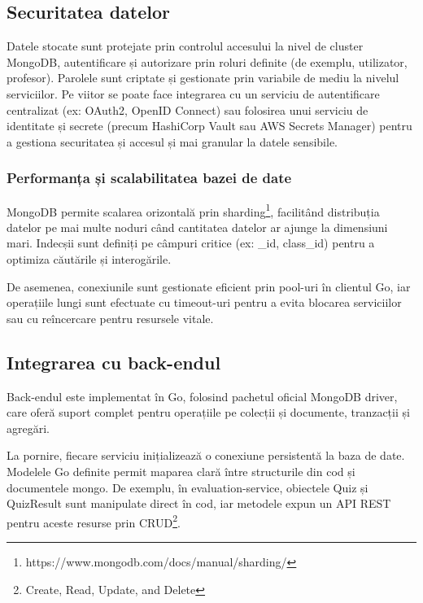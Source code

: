 \subsection{Securitatea datelor}

Datele stocate sunt protejate prin controlul accesului la nivel de cluster MongoDB, autentificare
și autorizare prin roluri definite (de exemplu, utilizator, profesor).
Parolele sunt criptate și gestionate prin variabile de mediu la nivelul serviciilor. Pe viitor 
se poate face integrarea cu un serviciu de autentificare centralizat (ex: OAuth2, OpenID Connect)
sau folosirea unui serviciu de identitate și secrete (precum HashiCorp Vault sau AWS Secrets Manager) pentru a gestiona
securitatea și accesul și mai granular la datele sensibile.

\subsubsection{Performanța și scalabilitatea bazei de date}

MongoDB permite scalarea orizontală prin sharding\footnote{https://www.mongodb.com/docs/manual/sharding/}, facilitând distribuția datelor pe mai multe noduri când 
cantitatea datelor ar ajunge la dimensiuni mari. Indecșii sunt definiți pe câmpuri critice 
(ex: \_id, class\_id) pentru a optimiza căutările și interogările.

De asemenea, conexiunile sunt gestionate eficient prin pool-uri în clientul Go, iar operațiile
lungi sunt efectuate cu timeout-uri pentru a evita blocarea serviciilor sau cu reîncercare pentru
resursele vitale.

\subsection{Integrarea cu back-endul}

Back-endul este implementat în Go, folosind pachetul oficial MongoDB driver, care oferă suport
complet pentru operațiile pe colecții și documente, tranzacții și agregări. 

La pornire, fiecare serviciu inițializează o conexiune persistentă la baza de date. Modelele Go
definite permit maparea clară între structurile din cod și documentele mongo.
De exemplu, în evaluation-service, obiectele Quiz și QuizResult
sunt manipulate direct în cod, iar metodele expun un API REST pentru aceste resurse prin CRUD\footnote{Create, Read, Update, and Delete}.


